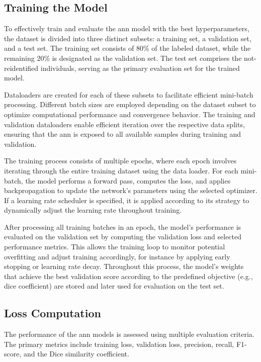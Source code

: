 \subsection{Training the Model} \label{sec:training}

To effectively train and evaluate the \ac{ann} model with the best hyperparameters, the dataset is divided into three distinct subsets: a training set, a validation set, and a test set.
The training set consists of 80\% of the labeled dataset, while the remaining 20\% is designated as the validation set.
The test set comprises the not-reidentified individuals, serving as the primary evaluation set for the trained model.

Dataloaders are created for each of these subsets to facilitate efficient mini-batch processing.
Different batch sizes are employed depending on the dataset subset to optimize computational performance and convergence behavior.
The training and validation dataloaders enable efficient iteration over the respective data splits, ensuring that the \ac{ann} is exposed to all available samples during training and validation.

The training process consists of multiple epochs, where each epoch involves iterating through the entire training dataset using the data loader.
For each mini-batch, the model performs a forward pass, computes the loss, and applies backpropagation to update the network’s parameters using the selected optimizer.
If a learning rate scheduler is specified, it is applied according to its strategy to dynamically adjust the learning rate throughout training.

After processing all training batches in an epoch, the model’s performance is evaluated on the validation set by computing the validation loss and selected performance metrics.
This allows the training loop to monitor potential overfitting and adjust training accordingly, for instance by applying early stopping or learning rate decay.
Throughout this process, the model's weights that achieve the best validation score according to the predefined objective (e.g., dice coefficient) are stored and later used for evaluation on the test set.


\subsection{Loss Computation}

The performance of the \ac{ann} models is assessed using multiple evaluation criteria.
The primary metrics include training loss, validation loss, precision, recall, F1-score, and the Dice similarity coefficient.

